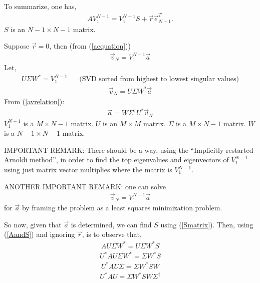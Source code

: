 \documentclass[]{article}
\begin{document}
To summarize, one has,
\begin{eqnarray}
AV_{1}^{N-1}=V_{1}^{N-1}S+\vec{r}\vec{e}^{T}_{N-1}. \label{AandS}
\end{eqnarray}
$S$ is an $N-1\times N-1$ matrix.
\par\noindent
Suppose $\vec{r}=0$, then (from (\ref{aequation}))
\begin{eqnarray}
\vec{v}_{N}=V_{1}^{N-1}\vec{a}
\end{eqnarray}
Let,
\begin{eqnarray}
U\Sigma W^{\ast}=V_{1}^{N-1} \hspace{20pt}
\mbox{(SVD sorted from highest to lowest singular values)}
\end{eqnarray}
\begin{eqnarray}
\vec{v}_{N}=U\Sigma W^{\ast}\vec{a} \label{avrelation} 
\end{eqnarray}
From (\ref{avrelation}):
\begin{eqnarray}
	\vec{a}=W\Sigma^{\dagger}U^{\ast}\vec{v}_{N} \label{not_efficient}
\end{eqnarray}
$V_{1}^{N-1}$ is a $M\times N-1$ matrix.
$U$ is an $M\times M$ matrix.  $\Sigma$ is a $M\times N-1$ matrix. $W$ is
a $N-1\times N-1$ matrix.
\par\noindent
IMPORTANT REMARK:
There should be a way, using the ``Implicitly restarted
Arnoldi method''\cite{lehoucq2001implicitly}, in order to find the
top eigenvalues and eigenvectors of $V_{1}^{N-1}$
using just matrix vector multiplies where the matrix is 
$V_{1}^{N-1}$.
\par\noindent
ANOTHER IMPORTANT REMARK:
one can solve
\begin{eqnarray}
	\vec{v}_{N}=V_{1}^{N-1}\vec{a} \label{a_equation}
\end{eqnarray}
for $\vec{a}$ by framing the problem as a least squares  minimization 
problem.
\par\noindent
So now, given that $\vec{a}$ is determined, we can find $S$ using
(\ref{Smatrix}).  Then, using (\ref{AandS}) and ignoring $\vec{r}$,  is to
observe that,
\begin{eqnarray}
AU\Sigma W^{\ast}=U\Sigma W^{\ast} S
\end{eqnarray}
\begin{eqnarray}
U^{\ast}AU\Sigma W^{\ast}=\Sigma W^{\ast} S
\end{eqnarray}
\begin{eqnarray}
U^{\ast}AU\Sigma =\Sigma W^{\ast} S W
\end{eqnarray}
\begin{eqnarray}
U^{\ast}AU =\Sigma W^{\ast} S W \Sigma^{\dagger} \label{similar}
\end{eqnarray}
\end{document}
